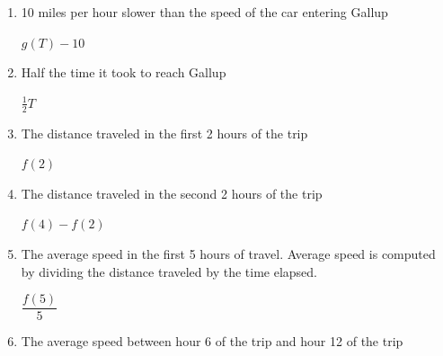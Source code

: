\documentclass{article}
\begin{document}
\begin{enumerate}
\begin{enumerate}
\begin{enumerate}
    \item
      \begin{problem}[\vfill]
        10 miles per hour slower than the speed of the car entering
        Gallup
      \end{problem}

      \begin{solution} 
        $g(T) - 10$        
      \end{solution} 

    \item
      \begin{problem}[\vfill]
        Half the time it took to reach Gallup
      \end{problem}

      \begin{solution} 
        $\displaystyle \frac12T$        
      \end{solution} 

    \item
      \begin{problem}[\vfill]
        The distance traveled in the first 2 hours of the trip
      \end{problem}

      \begin{solution} 
        $f(2)$         
      \end{solution} 

    \item
      \begin{problem}[\vfill]
        The distance traveled in the second 2 hours of the trip
      \end{problem}

      \begin{solution} 
        $f(4) - f(2) $         
      \end{solution} 

    \item
      \begin{problem}[\vfill]
        The average speed in the first 5 hours of travel. Average speed is computed by dividing the distance traveled by the time elapsed.
      \end{problem}

      \begin{solution} 
        $\dfrac{ f(5)}{5}$        
      \end{solution} 

    \item
      \begin{problem}[\vfill\newpage]
        The average speed between hour 6 of the trip and hour 12 of the trip
      \end{problem}


\end{enumerate}
\end{enumerate}
\end{enumerate}
\end{document}
